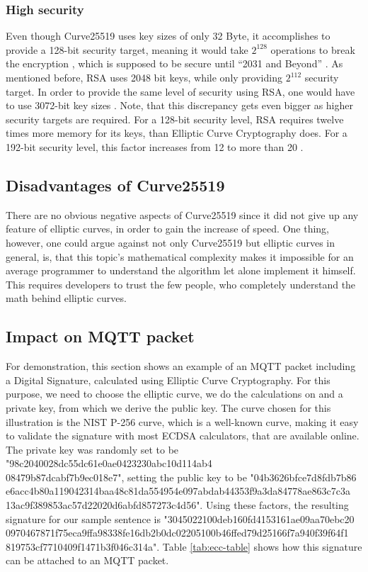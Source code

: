 \subsubsection{High security}
Even though Curve25519 uses key sizes of only 32 Byte, it accomplishes to provide a 128-bit security target, meaning it would take $ 2^{128} $ operations to break the encryption \cite{SecLevel}, which is supposed to be secure until “2031 and Beyond” \cite{KeySize}. As mentioned before, RSA uses 2048 bit keys, while only providing $ 2^{112} $ security target. In order to provide the same level of security using RSA, one would have to use 3072-bit key sizes \cite{KeySize}. Note, that this discrepancy gets even bigger as higher security targets are required. For a 128-bit security level, RSA requires twelve times more memory for its keys, than Elliptic Curve Cryptography does. For a 192-bit security level, this factor increases from 12 to more than 20 \cite{SecLevelInc}.

\subsection{Disadvantages of Curve25519}
There are no obvious negative aspects of Curve25519 since it did not give up any feature of elliptic curves, in order to gain the increase of speed. One thing, however, one could argue against not only Curve25519 but elliptic curves in general, is, that this topic's mathematical complexity makes it impossible for an average programmer to understand the algorithm let alone implement it himself. This requires developers to trust the few people, who completely understand the math behind elliptic curves.

\newpage

\subsection{Impact on MQTT packet}
For demonstration, this section shows an example of an MQTT packet including a Digital Signature, calculated using Elliptic Curve Cryptography. For this purpose, we need to choose the elliptic curve, we do the calculations on and a private key, from which we derive the public key. The curve chosen for this illustration is the NIST P-256 curve, which is a well-known curve, making it easy to validate the signature with most ECDSA calculators, that are available online. The private key was randomly set to be "98c2040028dc55dc61e0ae0423230abc10d114ab4\\08479b87dcabf7b9ec018e7", setting the public key to be "04b3626bfce7d8fdb7b86\\e6acc4b80a119042314baa48c81da554954e097abdab44353f9a3da84778ae863c7c3a\\13ac9f389853ac57d22020d6abfd857273c4d56".
Using these factors, the resulting signature for our sample sentence is "3045022100deb160fd4153161ae09aa70ebc20\\0970467871f75eca9ffa98338fe16db2b0dc02205100b46ffed79d25166f7a940f39f64f1\\819753cf7710409f1471b3f046c314a". Table \ref{tab:ecc-table} shows how this signature can be attached to an MQTT packet.

